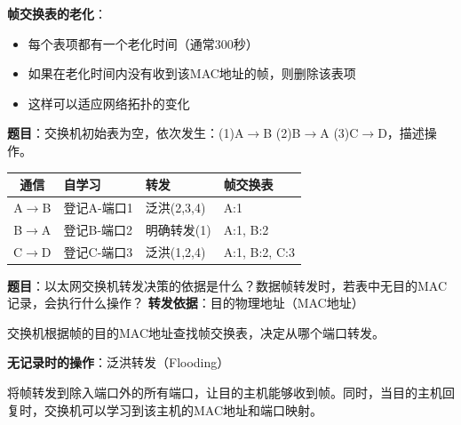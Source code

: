 \documentclass[12pt,a4paper,openany]{ctexbook}
\begin{document}
\textbf{帧交换表的老化}：
\begin{itemize}[leftmargin=2em,itemsep=0pt]
    \item 每个表项都有一个老化时间（通常300秒）
    \item 如果在老化时间内没有收到该MAC地址的帧，则删除该表项
    \item 这样可以适应网络拓扑的变化
\end{itemize}

\begin{examplebox}[例题3.5 交换机转发]
\textbf{题目}：交换机初始表为空，依次发生：(1)A$\to$B (2)B$\to$A (3)C$\to$D，描述操作。
\tcblower
\begin{tabular}{|c|l|l|l|}
\hline
\textbf{通信} & \textbf{自学习} & \textbf{转发} & \textbf{帧交换表} \\
\hline
A$\to$B & 登记A-端口1 & 泛洪(2,3,4) & A:1 \\
B$\to$A & 登记B-端口2 & 明确转发(1) & A:1, B:2 \\
C$\to$D & 登记C-端口3 & 泛洪(1,2,4) & A:1, B:2, C:3 \\
\hline
\end{tabular}
\end{examplebox}

\begin{examplebox}[例题3.5b 交换机转发决策]
\textbf{题目}：以太网交换机转发决策的依据是什么？数据帧转发时，若表中无目的MAC记录，会执行什么操作？
\tcblower
\textbf{转发依据}：目的物理地址（MAC地址）

交换机根据帧的目的MAC地址查找帧交换表，决定从哪个端口转发。

\textbf{无记录时的操作}：泛洪转发（Flooding）

将帧转发到除入端口外的所有端口，让目的主机能够收到帧。同时，当目的主机回复时，交换机可以学习到该主机的MAC地址和端口映射。
\end{examplebox}
\end{document}
